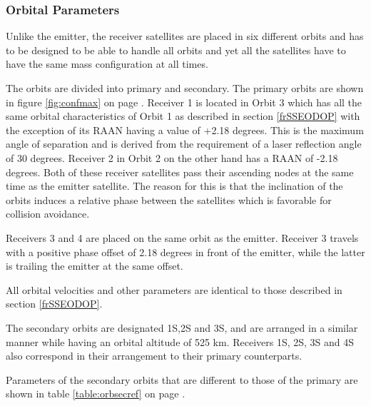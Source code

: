 \subsubsection{Orbital Parameters}
\label{frSSRODOP}

Unlike the emitter, the receiver satellites are placed in six different orbits and has to be designed to be able to handle all orbits and yet all the satellites have to have the same mass configuration at all times.

The orbits are divided into primary and secondary. The primary orbits are shown in figure \ref{fig:confmax} on page \pageref{fig:confmax}. Receiver 1 is located in Orbit 3 which has all the same orbital characteristics of Orbit 1 as described in section \ref{frSSEODOP} with the exception of its \acs{RAAN} having a value of +2.18 degrees. This is the maximum angle of separation and is derived from the requirement of a laser reflection angle of 30 degrees. Receiver 2 in Orbit 2 on the other hand has a \acs{RAAN} of -2.18 degrees. Both of these receiver satellites pass their ascending nodes at the same time as the emitter satellite. The reason for this is that the inclination of the orbits induces a relative phase between the satellites which is favorable for collision avoidance.

Receivers 3 and 4 are placed on the same orbit as the emitter. Receiver 3 travels with a positive phase offset of 2.18 degrees in front of the emitter, while the latter is trailing the emitter at the same offset.

All orbital velocities and other parameters are identical to those described in section \ref{frSSEODOP}.

The secondary orbits are designated 1S,2S and 3S, and are arranged in a similar manner while having an orbital altitude of 525 km. Receivers 1S, 2S, 3S and 4S also correspond in their arrangement to their primary counterparts.

Parameters of the secondary orbits that are different to those of the primary are shown in table \ref{table:orbsecref} on page \pageref{table:orbsecref}.

